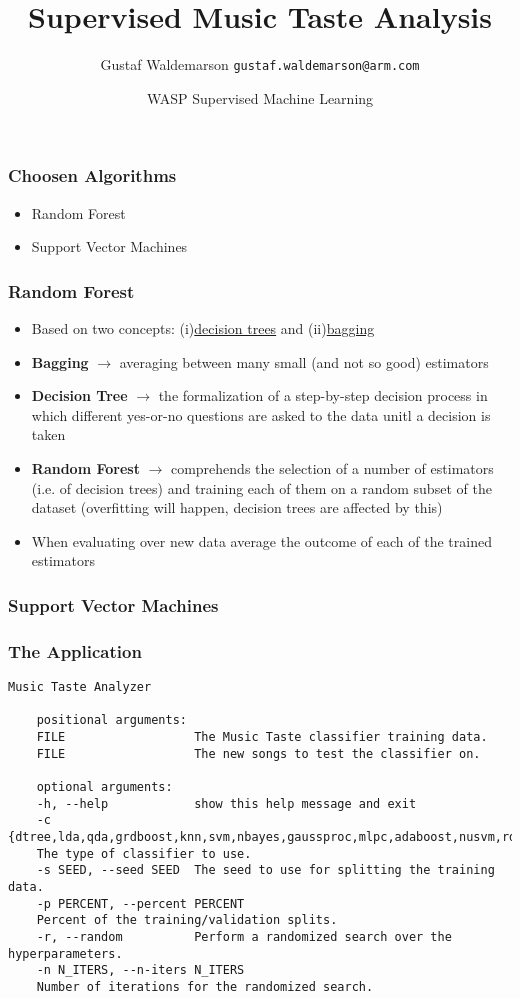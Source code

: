 \documentclass{beamer}
\title{Supervised Music Taste Analysis}
\date{WASP Supervised Machine Learning}
\author[Gustaf]{Gustaf Waldemarson \texttt{gustaf.waldemarson@arm.com}}
\begin{document}
\begin{frame}
  \titlepage
\end{frame}


\begin{frame}
  \frametitle{Choosen Algorithms}
  \begin{itemize}
  \item Random Forest
  \item Support Vector Machines
  \end{itemize}
\end{frame}

\begin{frame}
  \frametitle{Random Forest}
\begin{itemize}
\item Based on two concepts: (i)\underline{decision trees} and (ii)\underline{bagging}
\item \textbf{Bagging} $\rightarrow$ averaging between many small (and not so good) estimators
\item \textbf{Decision Tree} $\rightarrow$ the formalization of a step-by-step decision process in which different yes-or-no questions are asked to the data unitl a decision is taken
\item \textbf{Random Forest} $\rightarrow$ comprehends the selection of a number of estimators (i.e. of decision trees) and training each of them on a random subset of the dataset (overfitting will happen, decision trees are affected by this)
\item When evaluating over new data average the outcome of each of the trained estimators
\end{itemize}
\end{frame}


\begin{frame}
  \frametitle{Support Vector Machines}

\end{frame}


\begin{frame}[fragile]
  \frametitle{The Application}

\begin{Verbatim}[fontsize=\footnotesize]
    Music Taste Analyzer

    positional arguments:
    FILE                  The Music Taste classifier training data.
    FILE                  The new songs to test the classifier on.

    optional arguments:
    -h, --help            show this help message and exit
    -c {dtree,lda,qda,grdboost,knn,svm,nbayes,gaussproc,mlpc,adaboost,nusvm,rdforest},
    The type of classifier to use.
    -s SEED, --seed SEED  The seed to use for splitting the training data.
    -p PERCENT, --percent PERCENT
    Percent of the training/validation splits.
    -r, --random          Perform a randomized search over the hyperparameters.
    -n N_ITERS, --n-iters N_ITERS
    Number of iterations for the randomized search.
\end{Verbatim}

\end{frame}
\end{document}
